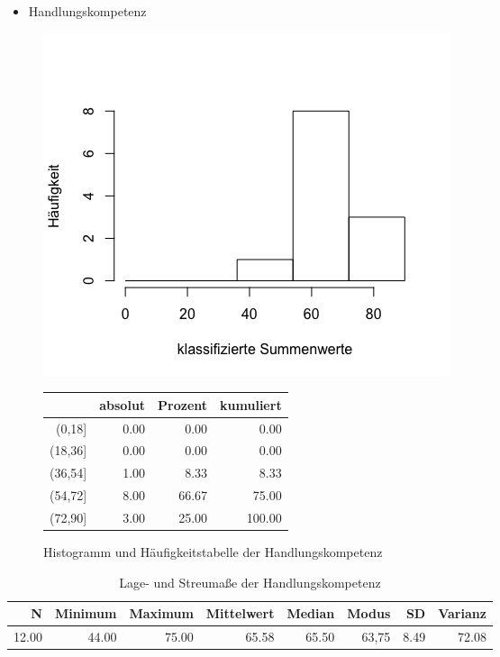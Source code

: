 \documentclass[12pt, bibliography=totoc]{scrartcl}
\begin{document}
\begin{itemize}
\tightlist
\item
  Handlungskompetenz
\end{itemize}

\begin{figure}[H]
\begin{minipage}{.5\linewidth}
\includegraphics[width=1.0\linewidth]{Anhang/HKHistn.png}

\label{pic:aufbau}
\end{minipage}
\begin{minipage}{.5\linewidth}
\centering
\raisebox{\depth}
{\begin{tabular}{rrrr}
  \hline
 & absolut & Prozent & kumuliert \\ 
  \hline
(0,18] & 0.00 & 0.00 & 0.00 \\ 
  (18,36] & 0.00 & 0.00 & 0.00 \\ 
  (36,54] & 1.00 & 8.33 & 8.33 \\ 
  (54,72] & 8.00 & 66.67 & 75.00 \\ 
  (72,90] & 3.00 & 25.00 & 100.00 \\ 
   \hline
\end{tabular}

}
\label{tab:defis}
\end{minipage}
\caption{Histogramm und Häufigkeitstabelle der Handlungskompetenz}
\end{figure}

\begin{table}[H]
\centering
\caption{Lage- und Streumaße der Handlungskompetenz}
\begin{tabular}{rrrrrrrr}
  \hline
  N & Minimum & Maximum & Mittelwert & Median & Modus & SD & Varianz \\
  \hline
12.00 & 44.00 & 75.00 & 65.58 & 65.50 & 63,75 & 8.49 & 72.08 \\
   \hline
\end{tabular}
\end{table}
\end{document}
